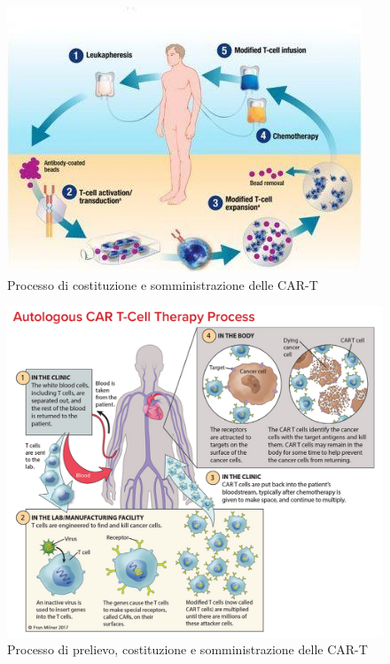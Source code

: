 \begin{figure}[H]
    \begin{center}
    \includegraphics[width=0.58\columnwidth]{img/car-t process.jpeg}
    \end{center}
    \caption[Processo di costituzione e somministrazione delle CAR-T]{Processo di costituzione e somministrazione delle CAR-T
    \cite{img23}}

\end{figure}

\begin{figure}[H]
    \begin{center}
    \includegraphics[width=0.8\columnwidth]{img/CART_TherapyProcess_Oct2020.jpeg}
    \end{center}
    \caption[Processo di prelievo, costituzione e somministrazione delle CAR-T]{Processo di prelievo, costituzione e somministrazione delle CAR-T
    \cite{img24}}

\end{figure}

